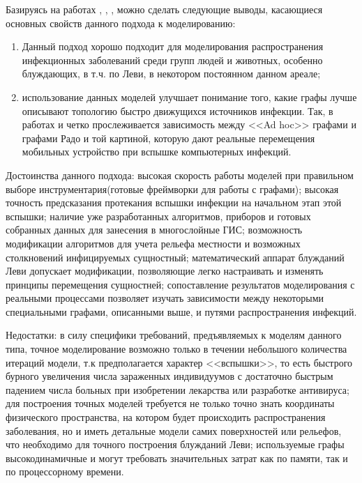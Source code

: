 Базируясь на работах %
\cite{Rhee:2007},
\cite{Privalov:2015} ,
\cite{Klimentiev:2012},
\cite{Klimentiev:2016} можно сделать следующие выводы, касающиеся основных свойств данного подхода к моделированию: 
\begin{enumerate}
	\item Данный подход хорошо подходит для моделирования распространения инфекционных заболеваний среди групп людей и животных, особенно блуждающих, в т.ч. по Леви, в некотором постоянном данном ареале;
	\item использование данных моделей улучшает понимание того, какие графы лучше описывают топологию быстро движущихся источников инфекции. Так, в работах %
	\cite{Klimentiev:2012} и %
	\cite{Klimentiev:2015} четко прослеживается зависимость между <<Ad hoc>> графами и графами Радо и той картиной, которую дают реальные перемещения мобильных устройство при вспышке компьютерных инфекций.
\end{enumerate}


Достоинства данного подхода: высокая скорость работы моделей при правильном выборе инструментария(готовые фреймворки для работы с графами); высокая точность предсказания протекания вспышки инфекции на начальном этап этой вспышки; наличие уже разработанных алгоритмов, приборов и готовых собранных данных для занесения в многослойные ГИС; возможность модификации алгоритмов для учета рельефа местности и возможных столкновений инфицируемых  сущностный; математический аппарат блужданий Леви допускает модификации, позволяющие легко настраивать и изменять принципы перемещения сущностней; сопоставление результатов моделирования с реальными процессами позволяет изучать зависимости между некоторыми специальными графами, описанными выше, и путями распространения инфекций. 


Недостатки: в силу специфики требований, предъявляемых к моделям данного типа, точное моделирование возможно только в течении небольшого количества итераций модели, т.к предполагается характер <<вспышки>>, то есть быстрого бурного увеличения числа зараженных индивидуумов с достаточно быстрым падением числа больных при изобретении лекарства или разработке антивируса; для построения точных моделей требуется не только точно знать координаты физического пространства, на котором будет происходить распространения заболевания, но и иметь детальные модели самих поверхностей или рельефов, что необходимо для точного построения блужданий Леви; используемые графы высокодинамичные и могут требовать значительных затрат как по памяти, так и по процессорному времени.

